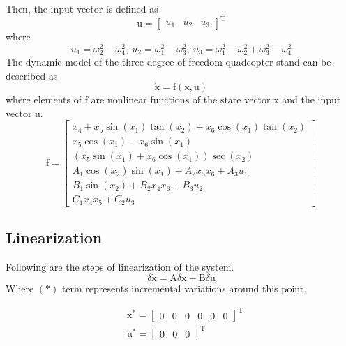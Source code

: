 \documentclass[conference]{IEEEtran}
\begin{document}
Then, the input vector is defined as
\begin{equation}
	\boldsymbol{\mathrm{u}} = \begin{bmatrix}
		u_1&u_2&u_3
	\end{bmatrix}^\mathrm{T}
\end{equation}
where 
\begin{equation}\label{SISO_force}
	u_1 = \omega_2^2 - \omega_4^2, ~
	u_2 = \omega_1^2 - \omega_3^2, ~
	u_3 = \omega_1^2 - \omega_2^2  + \omega_3^2 - \omega_4^2
\end{equation}
The dynamic model of the three-degree-of-freedom quadcopter stand can be described as
\begin{equation}
	\boldsymbol{\dot{\mathrm{x}}} = \boldsymbol{\mathrm{f}}(\boldsymbol{\mathrm{x}}, \boldsymbol{\mathrm{u}})
\end{equation}
where elements of $\boldsymbol{\mathrm{f}}$ are nonlinear functions of the state vector $\boldsymbol{\mathrm{x}}$
and the input vector $\boldsymbol{\mathrm{u}}$.
\begin{equation}
	\boldsymbol{\mathrm{f}} = \begin{bmatrix}
		x_4 + x_5\sin(x_1)\tan(x_2) + x_6\cos(x_1)\tan(x_2)\\
		x_5\cos(x_1)- x_6\sin(x_1)\\
		(x_5\sin(x_1) + x_6\cos(x_1))\sec(x_2)\\
		A_1\cos(x_2)\sin(x_1) + 
		A_2x_5x_6 + A_3u_1
		\\
		B_1\sin(x_2) + 
		B_2x_4x_6 + B_3u_2\\
		C_1x_4x_5 + 
		C_2u_3
	\end{bmatrix}
\end{equation} 
\subsection{Linearization}
Following are the steps of linearization of the system.
\begin{equation}
	\delta \dot{\boldsymbol{\mathrm{x}}} = \boldsymbol{\mathrm{A}}\delta \boldsymbol{\mathrm{x}} + \boldsymbol{\mathrm{B}}\delta \boldsymbol{\mathrm{u}}
\end{equation}
Where $(*)$ term represents incremental variations around this point. 

\begin{equation}
	\begin{split}
		&\boldsymbol{\mathrm{x}^*} = \begin{bmatrix}
			0& 0 & 0 & 0& 0& 0
		\end{bmatrix}^\mathrm{T}\\
		&\boldsymbol{\mathrm{u}^*} = \begin{bmatrix}
			0&0&0
		\end{bmatrix}^\mathrm{T}
	\end{split}
\end{equation}
\end{document}
